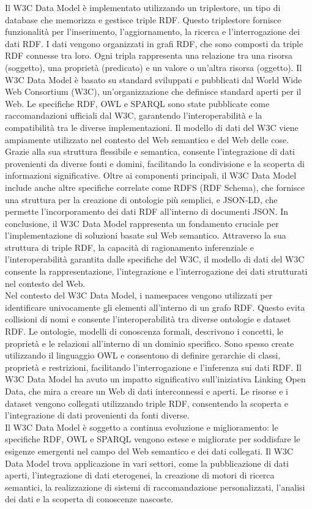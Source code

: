 Il W3C Data Model è implementato utilizzando un triplestore, un tipo di database che memorizza e gestisce triple RDF. Questo triplestore fornisce funzionalità per l'inserimento, l'aggiornamento, la ricerca e l'interrogazione dei dati RDF. I dati vengono organizzati in grafi RDF, che sono composti da triple RDF connesse tra loro. Ogni tripla rappresenta una relazione tra una risorsa (soggetto), una proprietà (predicato) e un valore o un'altra risorsa (oggetto).
Il W3C Data Model è basato su standard sviluppati e pubblicati dal World Wide Web Consortium (W3C), un'organizzazione che definisce standard aperti per il Web. Le specifiche RDF, OWL e SPARQL sono state pubblicate come raccomandazioni ufficiali dal W3C, garantendo l'interoperabilità e la compatibilità tra le diverse implementazioni.
Il modello di dati del W3C viene ampiamente utilizzato nel contesto del Web semantico e del Web delle cose. Grazie alla sua struttura flessibile e semantica, consente l'integrazione di dati provenienti da diverse fonti e domini, facilitando la condivisione e la scoperta di informazioni significative.
Oltre ai componenti principali, il W3C Data Model include anche altre specifiche correlate come RDFS (RDF Schema), che fornisce una struttura per la creazione di ontologie più semplici, e JSON-LD\glo, che permette l'incorporamento dei dati RDF all'interno di documenti JSON.
In conclusione, il W3C Data Model rappresenta un fondamento cruciale per l'implementazione di soluzioni basate sul Web semantico. Attraverso la sua struttura di triple RDF, la capacità di ragionamento inferenziale e l'interoperabilità garantita dalle specifiche del W3C, il modello di dati del W3C consente la rappresentazione, l'integrazione e l'interrogazione dei dati strutturati nel contesto del Web.\\

Nel contesto del W3C Data Model, i namespaces vengono utilizzati per identificare univocamente gli elementi all'interno di un grafo RDF. Questo evita collisioni di nomi e consente l'interoperabilità tra diverse ontologie e dataset RDF. Le ontologie, modelli di conoscenza formali, descrivono i concetti, le proprietà e le relazioni all'interno di un dominio specifico. Sono spesso create utilizzando il linguaggio OWL e consentono di definire gerarchie di classi, proprietà e restrizioni, facilitando l'interrogazione e l'inferenza sui dati RDF.
Il W3C Data Model ha avuto un impatto significativo sull'iniziativa Linking Open Data, che mira a creare un Web di dati interconnessi e aperti. Le risorse e i dataset vengono collegati utilizzando triple RDF, consentendo la scoperta e l'integrazione di dati provenienti da fonti diverse.\\
Il W3C Data Model è soggetto a continua evoluzione e miglioramento: le specifiche RDF, OWL e SPARQL vengono estese e migliorate per soddisfare le esigenze emergenti nel campo del Web semantico e dei dati collegati.
Il W3C Data Model trova applicazione in vari settori, come la pubblicazione di dati aperti, l'integrazione di dati eterogenei, la creazione di motori di ricerca semantici, la realizzazione di sistemi di raccomandazione personalizzati, l'analisi dei dati e la scoperta di conoscenze nascoste.\\

